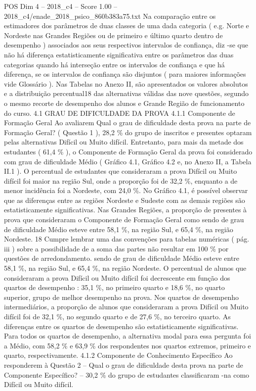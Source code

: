 \begin{textsample}{POS Dim 4 – 2018\_c4 – Score 1.00 – 2018\_c4/enade\_2018\_psico\_860b383a75.txt}
Na comparação entre os estimadores dos parâmetros de duas classes de uma dada categoria ( e.g.
Norte e Nordeste nas Grandes Regiões ou de primeiro e último quarto dentro de desempenho ) associados aos seus respectivos intervalos de confiança, diz -se que não há diferença estatisticamente significativa entre os parâmetros das duas categorias quando há interseção entre os intervalos de confiança e que há diferença, se os intervalos de confiança são disjuntos ( para maiores informações vide Glossário ).
Nas Tabelas no Anexo II, são apresentados os valores absolutos e a distribuição percentual18 das alternativas válidas das nove questões, segundo o mesmo recorte de desempenho dos alunos e Grande Região de funcionamento do curso. 4.1 GRAU DE DIFICULDADE DA PROVA 4.1.1 Componente de Formação Geral Ao avaliarem Qual o grau de dificuldade desta prova na parte de Formação Geral? ( Questão 1 ), 28,2 \% do grupo de inscritos e presentes optaram pelas alternativas Difícil ou Muito difícil.
Entretanto, para mais da metade dos estudantes ( 61,4 \% ), o Componente de Formação Geral da prova foi considerado com grau de dificuldade Médio ( Gráfico 4.1, Gráfico 4.2 e, no Anexo II, a Tabela II.1 ).
O percentual de estudantes que consideraram a prova Difícil ou Muito difícil foi maior na região Sul, onde a proporção foi de 32,2 \%, enquanto a de menor incidência foi a Nordeste, com 24,0 \%.
No Gráfico 4.1, é possível observar que as diferenças entre as regiões Nordeste e Sudeste com as demais regiões são estatisticamente significativas.
Nas Grandes Regiões, a proporção de presentes à prova que consideraram o Componente de Formação Geral como sendo de grau de dificuldade Médio esteve entre 58,1 \%, na região Sul, e 65,4 \%, na região Nordeste. 18 Cumpre lembrar uma das convenções para tabelas numéricas ( pág. iii ) sobre a possibilidade de a soma das partes não resultar em 100 \% por questões de arredondamento. sendo de grau de dificuldade Médio esteve entre 58,1 \%, na região Sul, e 65,4 \%, na região Nordeste.
O percentual de alunos que consideraram a prova Difícil ou Muito difícil foi decrescente em função dos quartos de desempenho : 35,1 \%, no primeiro quarto e 18,6 \%, no quarto superior, grupo de melhor desempenho na prova.
Nos quartos de desempenho intermediários, a proporção de alunos que consideraram a prova Difícil ou Muito difícil foi de 32,1 \%, no segundo quarto e de 27,6 \%, no terceiro quarto.
As diferenças entre os quartos de desempenho são estatisticamente significativas.
Para todos os quartos de desempenho, a alternativa modal para essa pergunta foi a Médio, com 58,2 \% e 63,9 \% dos respondentes nos quartos extremos, primeiro e quarto, respectivamente. 4.1.2 Componente de Conhecimento Específico Ao responderem à Questão 2 – Qual o grau de dificuldade desta prova na parte de Componente Específico? – 30,2 \% do grupo de estudantes classificaram -na como Difícil ou Muito difícil.

\end{textsample}
